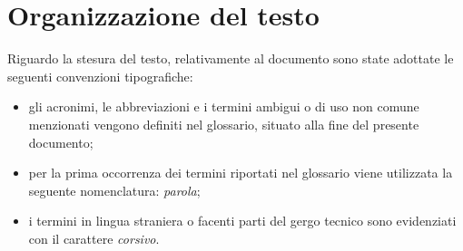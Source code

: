 \section{Organizzazione del testo}
Riguardo la stesura del testo, relativamente al documento sono state adottate le seguenti convenzioni tipografiche:
\begin{itemize}
	\item gli acronimi, le abbreviazioni e i termini ambigui o di uso non comune menzionati vengono definiti nel glossario, situato alla fine del presente documento;
	\item per la prima occorrenza dei termini riportati nel glossario viene utilizzata la seguente nomenclatura: \emph{parola}\glo;
	\item i termini in lingua straniera o facenti parti del gergo tecnico sono evidenziati con il carattere \emph{corsivo}.
\end{itemize}